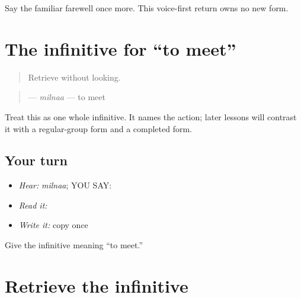 \begin{tcolorbox}[breakable,colback=teal!4,colframe=teal!35!black,title={Before you move on}]
Say the familiar farewell once more. This voice-first return owns no new form.
\end{tcolorbox}
\section[\texorpdfstring{\pa{ਮਿਲਣਾ} (milnaa)}{ਮਿਲਣਾ (milnaa)}]{The infinitive for “to meet”}

\label{lesson:PA-C188-milna}



\begin{quote}
Retrieve \textbf{ } without looking.
\end{quote}

\begin{grammarlens}[title={Grammar Lens: name the action}]
\begin{quote}
\textbf{} — \emph{milnaa} — to meet
\end{quote}

Treat this as one whole infinitive. It names the action; later lessons will contrast it with a regular-group form and a completed form.
\end{grammarlens}

\subsection*{Your turn}
\begin{itemize}
\raggedright
  \item \emph{Hear:} \emph{milnaa}; YOU SAY: \textbf{}
  \item \emph{Read it:} \textbf{}
  \item \emph{Write it:} copy \textbf{} once
\end{itemize}

\begin{tcolorbox}[breakable,colback=teal!4,colframe=teal!35!black,title={Before you move on}]
Give the infinitive meaning “to meet.”
\end{tcolorbox}
\section[\texorpdfstring{\pa{ਮਿਲਣਾ} (milnaa)}{ਮਿਲਣਾ (milnaa)}]{Retrieve the infinitive}

\label{lesson:PA-C188-milna-review}



